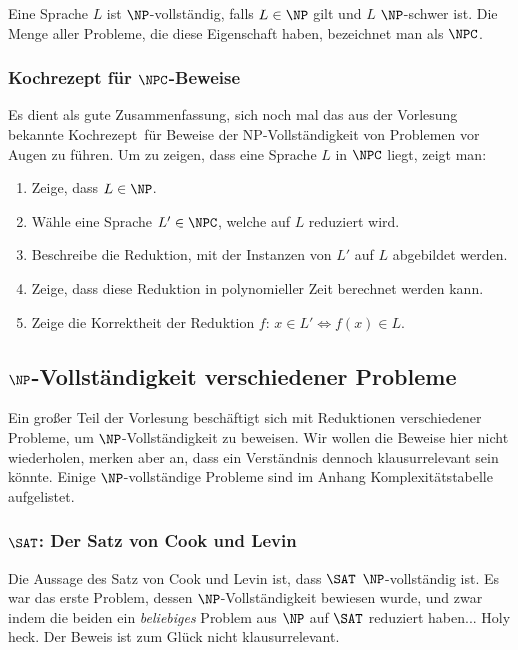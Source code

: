 \documentclass[a4paper,parskip=half*,DIV=7,fontsize=11pt]{scrartcl}
\begin{document}
Eine Sprache $L$ ist $\NP$-vollständig, falls $L \in \NP$ gilt und $L$ $\NP$-schwer ist. Die Menge aller Probleme, die diese Eigenschaft haben, bezeichnet man als $\NPC$.

\subsubsection[Kochrezept für NPC-Beweise]{Kochrezept für $\NPC$-Beweise}

Es dient als gute Zusammenfassung, sich noch mal das aus der Vorlesung bekannte \glqq Kochrezept\grqq\ für Beweise der NP-Vollständigkeit von Problemen vor Augen zu führen. Um zu zeigen, dass eine Sprache $L$ in $\NPC$ liegt, zeigt man:

\begin{enumerate}
\item Zeige, dass $L \in \NP$.
\item Wähle eine Sprache $L' \in \NPC$, welche auf $L$ reduziert wird.
\item Beschreibe die Reduktion, mit der Instanzen von $L'$ auf $L$ abgebildet werden.
\item Zeige, dass diese Reduktion in polynomieller Zeit berechnet werden kann.
\item Zeige die Korrektheit der Reduktion $f$: $x \in L' \iff f(x) \in L$.
\end{enumerate}

\subsection[NP-Vollständigkeit verschiedener Probleme]{$\NP$-Vollständigkeit verschiedener Probleme}

Ein großer Teil der Vorlesung beschäftigt sich mit Reduktionen verschiedener Probleme, um $\NP$-Vollständigkeit zu beweisen. Wir wollen die Beweise hier nicht wiederholen, merken aber an, dass ein Verständnis dennoch klausurrelevant sein könnte. Einige $\NP$-vollständige Probleme sind im Anhang Komplexitätstabelle aufgelistet.

\subsubsection[SAT: Der Satz von Cook und Levin]{$\SAT$: Der Satz von Cook und Levin}
Die Aussage des Satz von Cook und Levin ist, dass $\SAT$ $\NP$-vollständig ist. Es war das erste Problem, dessen $\NP$-Vollständigkeit bewiesen wurde, und zwar indem die beiden ein \textit{beliebiges} Problem aus $\NP$ auf $\SAT$ reduziert haben... Holy heck. Der Beweis ist zum Glück nicht klausurrelevant.
\end{document}
